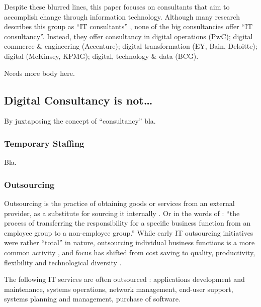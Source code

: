 \documentclass[12pt]{article}
\begin{document}
Despite these blurred lines, this paper focuses on consultants that aim
to accomplish change through information technology. Although many
research describes this group as ``IT consultants''
\citep{nevo2007, loh1992, fincham2006, armbruster2006, bloomfield1995, schwarz2005},
none of the big consultancies offer ``IT consultancy''. Instead, they
offer consultancy in digital operations (PwC); digital commerce \&
engineering (Accenture); digital transformation (EY, Bain, Deloitte);
digital (McKinsey, KPMG); digital, technology \& data (BCG).

Needs more body here.

\hypertarget{digital-consultancy-is-not}{%
\subsection{Digital Consultancy is
not\ldots{}}\label{digital-consultancy-is-not}}

By juxtaposing the concept of ``consultancy'' bla.

\hypertarget{temporary-staffing}{%
\subsubsection{Temporary Staffing}\label{temporary-staffing}}

Bla.

\hypertarget{outsourcing}{%
\subsubsection{Outsourcing}\label{outsourcing}}

Outsourcing is the practice of obtaining goods or services from an
external provider, as a substitute for sourcing it internally \citep[
2]{lacity2012}. Or in the words of \citet[374]{zhu2001}: ``the process
of transferring the responsibility for a specific business function from
an employee group to a non-employee group.'' While early IT outsourcing
initiatives were rather ``total'' \citet{willcocks1995} in nature,
outsourcing individual business functions is a more common activity
\citep[ 377]{zhu2001}, and focus has shifted from cost saving to
quality, productivity, flexibility and technological diversity \citep[
185]{kirilov2012}.

The following IT services are often outsourced \citep[ 167]{kipping2012}
: applications development and maintenance, systems operations, network
management, end-user support, systems planning and management, purchase
of software.
\end{document}
